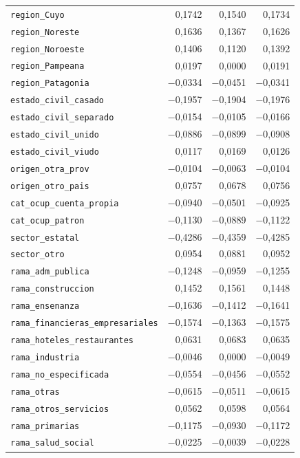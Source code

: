 \begin{longtable}{lrrr}
\texttt{region\_Cuyo} & 0,1742 & 0,1540 & 0,1734 \\
\texttt{region\_Noreste} & 0,1636 & 0,1367 & 0,1626 \\
\texttt{region\_Noroeste} & 0,1406 & 0,1120 & 0,1392 \\
\texttt{region\_Pampeana} & 0,0197 & 0,0000 & 0,0191 \\
\texttt{region\_Patagonia} & $-$0,0334 & $-$0,0451 & $-$0,0341 \\
\texttt{estado\_civil\_casado} & $-$0,1957 & $-$0,1904 & $-$0,1976 \\
\texttt{estado\_civil\_separado} & $-$0,0154 & $-$0,0105 & $-$0,0166 \\
\texttt{estado\_civil\_unido} & $-$0,0886 & $-$0,0899 & $-$0,0908 \\
\texttt{estado\_civil\_viudo} & 0,0117 & 0,0169 & 0,0126 \\
\texttt{origen\_otra\_prov} & $-$0,0104 & $-$0,0063 & $-$0,0104 \\
\texttt{origen\_otro\_pais} & 0,0757 & 0,0678 & 0,0756 \\
\texttt{cat\_ocup\_cuenta\_propia} & $-$0,0940 & $-$0,0501 & $-$0,0925 \\
\texttt{cat\_ocup\_patron} & $-$0,1130 & $-$0,0889 & $-$0,1122 \\
\texttt{sector\_estatal} & $-$0,4286 & $-$0,4359 & $-$0,4285 \\
\texttt{sector\_otro} & 0,0954 & 0,0881 & 0,0952 \\
\texttt{rama\_adm\_publica} & $-$0,1248 & $-$0,0959 & $-$0,1255 \\
\texttt{rama\_construccion} & 0,1452 & 0,1561 & 0,1448 \\
\texttt{rama\_ensenanza} & $-$0,1636 & $-$0,1412 & $-$0,1641 \\
\texttt{rama\_financieras\_empresariales} & $-$0,1574 & $-$0,1363 & $-$0,1575 \\
\texttt{rama\_hoteles\_restaurantes} & 0,0631 & 0,0683 & 0,0635 \\
\texttt{rama\_industria} & $-$0,0046 & 0,0000 & $-$0,0049 \\
\texttt{rama\_no\_especificada} & $-$0,0554 & $-$0,0456 & $-$0,0552 \\
\texttt{rama\_otras} & $-$0,0615 & $-$0,0511 & $-$0,0615 \\
\texttt{rama\_otros\_servicios} & 0,0562 & 0,0598 & 0,0564 \\
\texttt{rama\_primarias} & $-$0,1175 & $-$0,0930 & $-$0,1172 \\
\texttt{rama\_salud\_social} & $-$0,0225 & $-$0,0039 & $-$0,0228 \\

\end{longtable}
